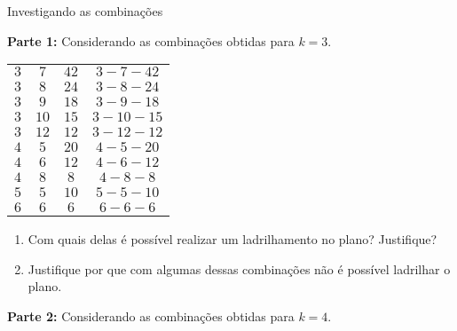  \label{at_ladsemi}

\begin{task} {Investigando as combinações}

\textbf{Parte 1:} Considerando as  combinações obtidas para $k=3$.
 
\begin{table}[H]
\centering
\setlength\tabcolsep{5mm}
\begin{tabu} to \textwidth{|c|c|c|c|}
\hline
{} &  &  &   \\
\hline
$3$ & $7$ & $42$ & $3-7-42$ \\
\hline
$3$ & $8$ & $24$ &  $3-8-24$ \\
\hline
$3$ & $9$ & $18$ &  $3-9-18$ \\
\hline
$3$ & $10$ & $15$ &  $ 3-10-15$ \\
\hline
$3$ & $12$ & $12$ &  $3-12-12$ \\
\hline
$4$ & $5$ & $20$ &  $4-5-20$ \\
\hline
$4$ & $6$ & $12$ &  $4-6-12$ \\
\hline
$4$ & $8$ & $8$ &  $4-8-8$ \\
\hline
$5$ & $5$ & $10$ &  $5-5-10$ \\
\hline
$6$ & $6$ & $6$ &  $6-6-6$ \\
\hline
\end{tabu}
\end{table}

\begin{enumerate}

\item	Com quais delas é possível realizar um ladrilhamento no plano? Justifique?
\item	Justifique por que com algumas dessas combinações não é possível ladrilhar o plano.

\end{enumerate}

\textbf{Parte 2:} Considerando as  combinações obtidas para $k=4$. 

\begin{table}[H]
\centering
\setlength\tabcolsep{5mm}
\begin{tabu} to \textwidth{|c|c|c|c|c|}
\hline
{} &  &  & &   \\
\hline


\end{tabu}
\end{table}
\end{task}
